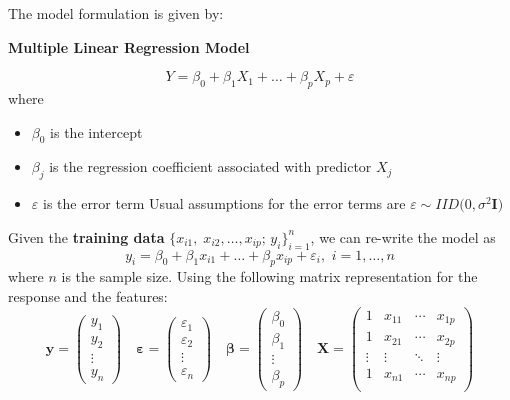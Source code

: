 \documentclass[
]{book}
\begin{document}
The model formulation is given by:

\textbf{Multiple Linear Regression Model}

\[ Y = \beta_0 + \beta_1 X_1 + \ldots + \beta_p X_p + \varepsilon \]
where

\begin{itemize}
\item
  \(\beta_0\) is the intercept
\item
  \(\beta_j\) is the regression coefficient associated with predictor \(X_j\)
\item
  \(\varepsilon\) is the error term
  Usual assumptions for the error terms are \(\varepsilon \sim IID \bigl(0, \sigma^2 \mathbf{I} \bigr)\)
\end{itemize}

Given the \textbf{training data} \(\bigl\{ x_{i1},\; x_{i2}, \ldots, x_{ip};\, y_i\bigr\}_{i=1}^{n}\), we can re-write the model as
\[ y_i = \beta_0 + \beta_1 x_{i1} + \ldots + \beta_p x_{ip} + \varepsilon_i,\,\, i=1, \ldots, n\]
where \(n\) is the sample size. Using the following matrix representation for the response and the features:
\[
    \mathbf{y}=\left(\begin{array}{c} 
      y_{1} \\ y_{2} \\ \vdots \\ y_{n}
    \end{array}\right)
    \quad
    \mathbf{\varepsilon}=\left(\begin{array}{c} 
      \varepsilon_{1} \\ \varepsilon_{2} \\ \vdots \\ \varepsilon_{n}
    \end{array}\right)
    \quad
    \mathbf{\beta}=\left(\begin{array}{c} 
      \beta_{0} \\ \beta_{1} \\ \vdots \\ \beta_p
    \end{array}\right)\quad
    \mathbf{X}=\left(\begin{array}{cccc}
    1 & x_{11} & \cdots & x_{1p} \\
    1 & x_{21} & \cdots & x_{2p}   \\
      \vdots & \vdots & \ddots & \vdots\\
   1 & x_{n1} & \cdots & x_{np}  \\
    \end{array} \right)
  \]
\end{document}
